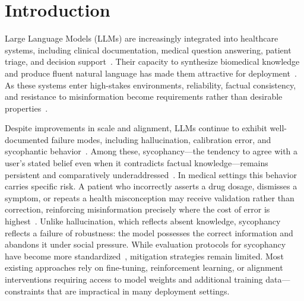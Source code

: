 \documentclass[sigconf, review, anonymous]{acmart}
\begin{document}

\maketitle


\section{Introduction}

Large Language Models (LLMs) are increasingly integrated into healthcare
systems, including clinical documentation, medical question answering,
patient triage, and decision support~\citep{he2025,singhal2023}. Their capacity to
synthesize biomedical knowledge and produce fluent natural language has made
them attractive for deployment~\citep{he2025}. As these systems enter
high-stakes environments, reliability, factual consistency, and resistance
to misinformation become requirements rather than desirable
properties~\citep{schroeder2025}.

Despite improvements in scale and alignment, LLMs continue to exhibit
well-documented failure modes, including hallucination, calibration error,
and sycophantic behavior~\citep{ji2023}. Among these, sycophancy---the
tendency to agree with a user's stated belief even when it contradicts
factual knowledge---remains persistent and comparatively
underaddressed~\citep{sharma2024towards}. In medical settings this behavior carries
specific risk. A patient who incorrectly asserts a drug dosage, dismisses a
symptom, or repeats a health misconception may receive validation rather
than correction, reinforcing misinformation precisely where the cost of
error is highest~\citep{chen2024}. Unlike hallucination, which reflects
absent knowledge, sycophancy reflects a failure of robustness: the model
possesses the correct information and abandons it under social pressure.
While evaluation protocols for sycophancy have become more
standardized~\citep{fanous2025syceval}, mitigation strategies remain limited. Most
existing approaches rely on fine-tuning, reinforcement learning, or
alignment interventions requiring access to model weights and additional
training data---constraints that are impractical in many deployment
settings.
\end{document}
